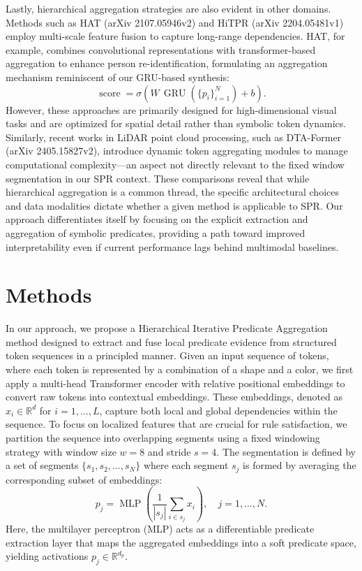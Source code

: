 \documentclass[11pt]{article}
\begin{document}
Lastly, hierarchical aggregation strategies are also evident in other domains. Methods such as HAT (arXiv 2107.05946v2) and HiTPR (arXiv 2204.05481v1) employ multi-scale feature fusion to capture long-range dependencies. HAT, for example, combines convolutional representations with transformer-based aggregation to enhance person re-identification, formulating an aggregation mechanism reminiscent of our GRU-based synthesis:
\[
\operatorname{score} = \sigma\left(W\,\operatorname{GRU}\left(\{p_i\}_{i=1}^{N}\right) + b\right).
\]
However, these approaches are primarily designed for high-dimensional visual tasks and are optimized for spatial detail rather than symbolic token dynamics. Similarly, recent works in LiDAR point cloud processing, such as DTA-Former (arXiv 2405.15827v2), introduce dynamic token aggregating modules to manage computational complexity—an aspect not directly relevant to the fixed window segmentation in our SPR context. These comparisons reveal that while hierarchical aggregation is a common thread, the specific architectural choices and data modalities dictate whether a given method is applicable to SPR. Our approach differentiates itself by focusing on the explicit extraction and aggregation of symbolic predicates, providing a path toward improved interpretability even if current performance lags behind multimodal baselines.

\section{Methods}
In our approach, we propose a Hierarchical Iterative Predicate Aggregation method designed to extract and fuse local predicate evidence from structured token sequences in a principled manner. Given an input sequence of tokens, where each token is represented by a combination of a shape and a color, we first apply a multi-head Transformer encoder with relative positional embeddings to convert raw tokens into contextual embeddings. These embeddings, denoted as \( x_i \in \mathbb{R}^d \) for \( i=1,\ldots,L \), capture both local and global dependencies within the sequence. To focus on localized features that are crucial for rule satisfaction, we partition the sequence into overlapping segments using a fixed windowing strategy with window size \(w=8\) and stride \(s=4\). The segmentation is defined by a set of segments \(\{s_1, s_2, \dots, s_N\}\) where each segment \(s_j\) is formed by averaging the corresponding subset of embeddings:
\[
p_j = \operatorname{MLP}\left(\frac{1}{|s_j|} \sum_{i \in s_j} x_i\right), \quad j=1,\dots,N.
\]
Here, the multilayer perceptron (MLP) acts as a differentiable predicate extraction layer that maps the aggregated embeddings into a soft predicate space, yielding activations \(p_j \in \mathbb{R}^{d_p}\).
\end{document}
